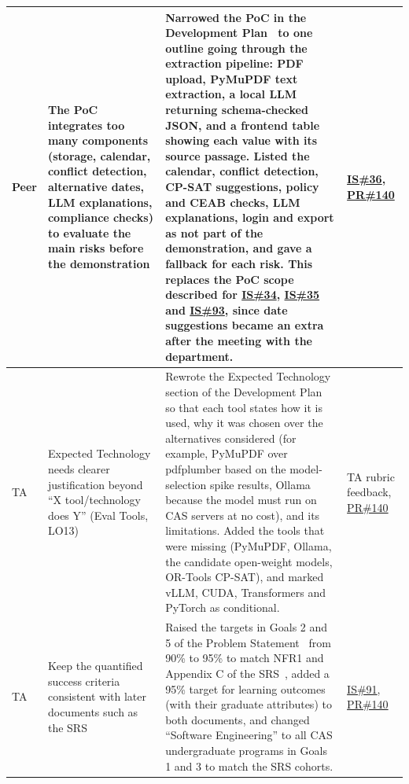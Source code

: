 \documentclass{article}
\begin{document}
\begin{longtable}{|p{2cm}|p{4cm}|p{5cm}|p{4cm}|}
\hline
Peer & The PoC integrates too many components (storage, calendar, conflict
detection, alternative dates, LLM explanations, compliance checks) to evaluate
the main risks before the demonstration & Narrowed the PoC in the Development
Plan~\citep{TeamBVSH2026DP} to one outline going through the extraction
pipeline: PDF upload, PyMuPDF text extraction, a local LLM returning
schema-checked JSON, and a frontend table showing each value with its source
passage. Listed the calendar, conflict detection, CP-SAT suggestions, policy and
CEAB checks, LLM explanations, login and export as not part of the
demonstration, and gave a fallback for each risk. This replaces the PoC scope
described for
\href{https://github.com/shivyam/cas-course-optimization/issues/34}{IS\#34},
\href{https://github.com/shivyam/cas-course-optimization/issues/35}{IS\#35} and
\href{https://github.com/shivyam/cas-course-optimization/issues/93}{IS\#93},
since date suggestions became an extra after the meeting with the department. &
\href{https://github.com/shivyam/cas-course-optimization/issues/36}{IS\#36}, \href{https://github.com/shivyam/cas-course-optimization/pull/140}{PR\#140} \\
\hline
TA & Expected Technology needs clearer justification beyond ``X tool/technology
does Y'' (Eval Tools, LO13) & Rewrote the Expected Technology section of the
Development Plan~\citep{TeamBVSH2026DP} so that each tool states how it is used,
why it was chosen over the alternatives considered (for example, PyMuPDF over
pdfplumber based on the model-selection spike results, Ollama because the model
must run on CAS servers at no cost), and its limitations. Added the tools that
were missing (PyMuPDF, Ollama, the candidate open-weight models, OR-Tools
CP-SAT), and marked vLLM, CUDA, Transformers and PyTorch as conditional. & TA
rubric feedback, \href{https://github.com/shivyam/cas-course-optimization/pull/140}{PR\#140} \\
\hline
TA & Keep the quantified success criteria consistent with later documents such
as the SRS & Raised the targets in Goals 2 and 5 of the Problem
Statement~\citep{TeamBVSH2026PS} from 90\% to 95\% to match NFR1 and Appendix C
of the SRS~\citep{TeamBVSH2026SRS}, added a 95\% target for learning outcomes
(with their graduate attributes) to both documents, and changed ``Software
Engineering'' to all CAS undergraduate programs in Goals 1 and 3 to match the
SRS cohorts. &
\href{https://github.com/shivyam/cas-course-optimization/issues/91}{IS\#91}, \href{https://github.com/shivyam/cas-course-optimization/pull/140}{PR\#140} \\

\end{longtable}
\end{document}
